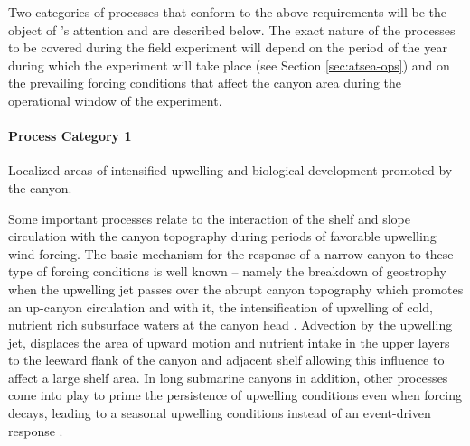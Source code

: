  
Two categories of processes that conform to the above requirements
will be the object of \proje's attention and are described below. The
exact nature of the processes to be covered during the field
experiment will depend on the period of the year during which the
experiment will take place (see Section \ref{sec:atsea-ops}) and on
the prevailing forcing conditions that affect the \naz canyon area
during the operational window of the experiment.

  
\paragraph{Process Category 1} Localized areas of intensified
upwelling and biological development promoted by the canyon.

Some important processes relate to the interaction of the shelf and
slope circulation with the canyon topography during periods of
favorable upwelling wind forcing. The basic mechanism for the response
of a narrow canyon to these type of forcing conditions is well known
-- namely the breakdown of geostrophy when the upwelling jet passes
over the abrupt canyon topography which promotes an up-canyon
circulation and with it, the intensification of upwelling of cold,
nutrient rich subsurface waters at the canyon head
\cite{klinck96,she00}. Advection by the upwelling jet, displaces the
area of upward motion and nutrient intake in the upper layers to the
leeward flank of the canyon and adjacent shelf allowing this influence
to affect a large shelf area. In long submarine canyons in addition,
other processes come into play to prime the persistence of upwelling
conditions even when forcing decays, leading to a seasonal upwelling
conditions instead of an event-driven response
\cite{allen00,waterhouse09}.

